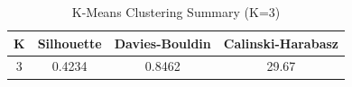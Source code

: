 \begin{table}[htbp]
\centering
\caption{K-Means Clustering Summary (K=3)}
\label{tab:clustering_summary}
\begin{tabular}{cccc}
\toprule
\textbf{K} & \textbf{Silhouette} & \textbf{Davies-Bouldin} & \textbf{Calinski-Harabasz} \\
\midrule
    3 & 0.4234 & 0.8462 & 29.67 \\
\bottomrule
\end{tabular}
\end{table}
